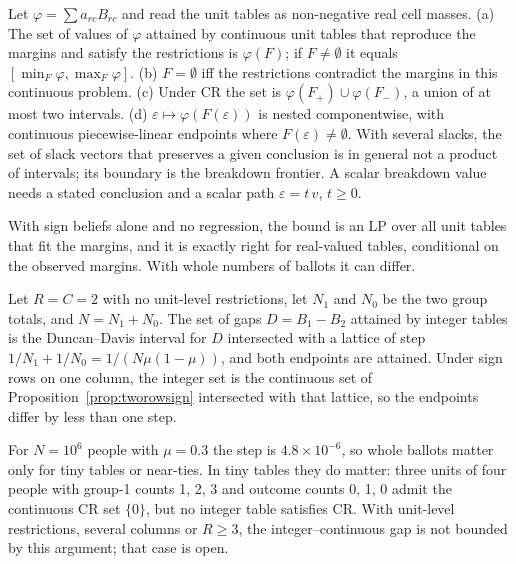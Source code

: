 \begin{proposition}\label{prop:N1}
Let $\varphi=\sum a_{rc}B_{rc}$ and read the unit tables as non-negative real cell
masses. (a) The set of values of $\varphi$ attained by continuous unit tables that
reproduce the margins and satisfy the restrictions is $\varphi(F)$; if
$F\ne\emptyset$ it equals $[\min_F\varphi,\max_F\varphi]$. (b) $F=\emptyset$ iff
the restrictions contradict the margins in this continuous problem. (c) Under CR
the set is $\varphi(F_+)\cup\varphi(F_-)$, a union of at most two intervals.
(d) $\varepsilon\mapsto\varphi(F(\varepsilon))$ is nested componentwise, with
continuous piecewise-linear endpoints where $F(\varepsilon)\neq\emptyset$. With
several slacks, the set of slack vectors that preserves a given conclusion is in
general not a product of intervals; its boundary is the breakdown frontier. A
scalar breakdown value needs a stated conclusion and a scalar path
$\varepsilon=t\,v$, $t\ge0$.
\end{proposition}
\begin{reading}
With sign beliefs alone and no regression, the bound is an LP over all unit tables
that fit the margins, and it is exactly right for real-valued tables, conditional
on the observed margins. With whole numbers of ballots it can differ.
\end{reading}

\begin{proposition}\label{prop:integer}
Let $R=C=2$ with no unit-level restrictions, let $N_1$ and $N_0$ be the two
group totals, and $N=N_1+N_0$. The set of gaps $D=B_1-B_2$ attained by integer
tables is the Duncan--Davis interval for $D$ intersected with a lattice of step
$1/N_1+1/N_0=1/(N\mu(1-\mu))$, and both endpoints are attained. Under sign rows
on one column, the integer set is the continuous set of
Proposition~\ref{prop:tworowsign} intersected with that lattice, so the
endpoints differ by less than one step.
\end{proposition}
\begin{reading}
For $N=10^6$ people with $\mu=0.3$ the step is $4.8\times10^{-6}$, so whole
ballots matter only for tiny tables or near-ties. In tiny tables they do matter:
three units of four people with group-1 counts 1, 2, 3 and outcome counts 0, 1, 0
admit the continuous CR set $\{0\}$, but no integer table satisfies CR. With
unit-level restrictions, several columns or $R\ge3$, the integer--continuous gap is
not bounded by this argument; that case is open.
\end{reading}


